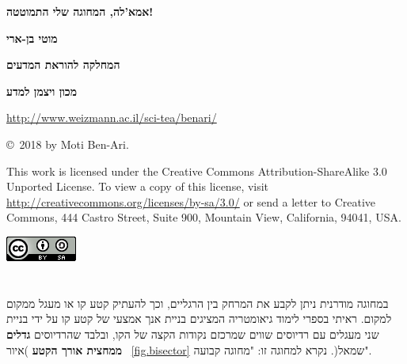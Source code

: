 \documentclass[12pt,a4paper]{article}
\begin{document}
\thispagestyle{empty}


\begin{center}
\textbf{\Huge%
אמא'לה, המחוגה שלי התמוטטה!
}

\bigskip

\bigskip

\textbf{\Large מוטי בן-ארי}

\bigskip

\textbf{\Large המחלקה להוראת המדעים}

\bigskip

\textbf{\Large מכון ויצמן למדע}

\bigskip

\url{http://www.weizmann.ac.il/sci-tea/benari/}
\end{center}

\bigskip
\bigskip

\begin{center}
\copyright{}\  2018 by Moti Ben-Ari.

\end{center}


{\small This work is licensed under the Creative Commons Attribution-ShareAlike 3.0 Unported License. To view a copy of this license, visit \url{http://creativecommons.org/licenses/by-sa/3.0/} or send a letter to Creative Commons, 444 Castro Street, Suite 900, Mountain View, California, 94041, USA.}

\bigskip

\begin{center}
\includegraphics[width=.2\textwidth]{../by-sa.png}
\end{center}


\newpage


\section{
}

במחוגה מודרנית ניתן לקבע את המרחק בין הרגליים, וכך להעתיק קטע קו או מעגל ממקום למקום. ראיתי בספרי לימוד גיאומטריה המציגים בניית אנך אמצעי של קטע קו על ידי בניית שני מעגלים עם רדיוסים שווים שמרכזם נקודות הקצה של הקו, ובלבד שהרדיוסים
\textbf{גדלים ממחצית אורך הקטע}
 )איור~%
\ref{fig.bisector}
שמאל(. נקרא למחוגה זו: "מחוגה קבועה".
\end{document}
